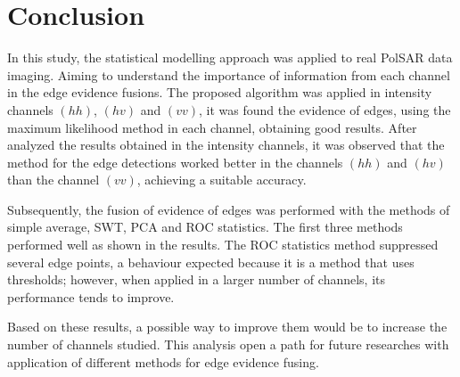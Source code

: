 \documentclass[conference]{IEEEtran}
\begin{document}
\section{Conclusion}\label{sec_09}
In this study, the statistical modelling approach was applied to real PolSAR data imaging. Aiming to understand the importance of information from each channel in the edge evidence fusions. The proposed algorithm was applied in intensity channels $(hh)$, $(hv)$ and $(vv)$, it was found the evidence of edges, using the maximum likelihood  method in each channel, obtaining good results. After analyzed the results obtained in the intensity channels, it was observed that the method for the edge detections worked better in the channels $(hh)$ and $(hv)$ than the channel $(vv)$, achieving a suitable accuracy.

Subsequently, the fusion of evidence of edges was performed with the methods of simple average, SWT, PCA and ROC statistics. The first three methods performed well as shown in the results. The ROC statistics method suppressed several edge points, a behaviour expected because it is a method that uses thresholds; however, when applied in a larger number of channels, its performance tends to improve. 

Based on these results, a possible way to improve them would be to increase the number of channels studied. This analysis open a path for future researches with application of different methods for edge evidence fusing.


\end{document}
